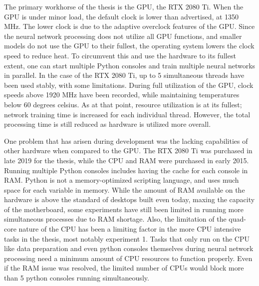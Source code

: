 The primary workhorse of the thesis is the GPU, the RTX 2080 Ti\cite{rtx2080}.
When the GPU is under minor load, the default clock is lower than advertised, at 1350 MHz.
The lower clock is due to the adaptive overclock features of the GPU.
Since the neural network processing does not utilize all GPU functions, and smaller models do not use the GPU to their fullest, the operating system lowers the clock speed to reduce heat.
To circumvent this and use the hardware to its fullest extent, one can start multiple Python consoles and train multiple neural networks in parallel.
In the case of the RTX 2080 Ti, up to 5 simultaneous threads have been used stably, with some limitations.
During full utilization of the GPU, clock speeds above 1920 MHz have been recorded, while maintaining temperatures below 60 degrees celsius.
As at that point, resource utilization is at its fullest; network training time is increased for each individual thread. 
However, the total processing time is still reduced as hardware is utilized more overall.

One problem that has arisen during development was the lacking capabilities of other hardware when compared to the GPU.
The RTX 2080 Ti was purchased in late 2019 for the thesis, while the CPU and RAM were purchased in early 2015.
Running multiple Python consoles includes having the cache for each console in RAM.
Python is not a memory-optimized scripting language, and uses much space for each variable in memory\cite{theano:memory}.
While the amount of RAM available on the hardware is above the standard of desktops built even today, maxing the capacity of the motherboard, some experiments have still been limited in running more simultaneous processes due to RAM shortage.
Also, the limitation of the quad-core nature of the CPU has been a limiting factor in the more CPU intensive tasks in the thesis, most notably experiment 1.%
Tasks that only run on the CPU like data preparation and even python consoles themselves during neural network processing need a minimum amount of CPU resources to function properly.
Even if the RAM issue was resolved, the limited number of CPUs would block more than 5 python consoles running simultaneously.

